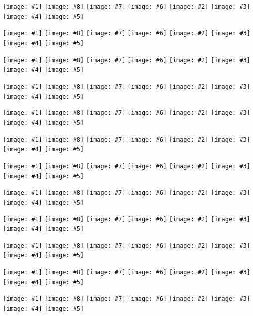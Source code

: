 \documentclass{article}
\newcommand{\zine}[8]{%
	\thispagestyle{empty}		
	\centering
	\texttt{[image: \#1]} %
	\hfill
	\texttt{[image: \#8]} %
	\hfill
	\texttt{[image: \#7]} %
	\hfill
	\texttt{[image: \#6]} %
	\texttt{[image: \#2]} %
	\hfill
	\texttt{[image: \#3]} %
	\hfill
	\texttt{[image: \#4]} %
	\hfill
	\texttt{[image: \#5]} %
}%
\begin{document}
	\zine{zine Cover 12 .pdf}{zine [1, 0, 1, 2] .pdf}{zine [2, 1, 0, 0] .pdf}{zine [0, 2, 2, 1] .pdf}{zine blank .pdf}{zine blank .pdf}{zine blank .pdf}{zine Back [3, 0, 2, 4] [[1, 0, 1, 2], [2, 1, 0, 0], [0, 2, 2, 1]] .pdf}
	\zine{zine Cover 13 .pdf}{zine [1, 1, 0, 1] .pdf}{zine [2, 0, 1, 2] .pdf}{zine [0, 2, 2, 0] .pdf}{zine blank .pdf}{zine blank .pdf}{zine blank .pdf}{zine Back [3, 2, 0, 3] [[1, 1, 0, 1], [2, 0, 1, 2], [0, 2, 2, 0]] .pdf}
	\zine{zine Cover 14 .pdf}{zine [0, 0, 0, 1] .pdf}{zine [1, 1, 2, 0] .pdf}{zine [2, 2, 1, 2] .pdf}{zine blank .pdf}{zine blank .pdf}{zine blank .pdf}{zine Back [0, 0, 1, 2] [[0, 0, 0, 1], [1, 1, 2, 0], [2, 2, 1, 2]] .pdf}
	\zine{zine Cover 15 .pdf}{zine [2, 2, 1, 2] .pdf}{zine [0, 0, 0, 0] .pdf}{zine [1, 1, 2, 1] .pdf}{zine blank .pdf}{zine blank .pdf}{zine blank .pdf}{zine Back [4, 4, 2, 4] [[2, 2, 1, 2], [0, 0, 0, 0], [1, 1, 2, 1]] .pdf}
	\zine{zine Cover 16 .pdf}{zine [1, 1, 1, 2] .pdf}{zine [0, 0, 2, 1] .pdf}{zine [2, 2, 0, 0] .pdf}{zine blank .pdf}{zine blank .pdf}{zine blank .pdf}{zine Back [2, 2, 3, 5] [[1, 1, 1, 2], [0, 0, 2, 1], [2, 2, 0, 0]] .pdf}
	\zine{zine Cover 17 .pdf}{zine [1, 0, 1, 2] .pdf}{zine [2, 2, 0, 1] .pdf}{zine [0, 1, 2, 0] .pdf}{zine blank .pdf}{zine blank .pdf}{zine blank .pdf}{zine Back [3, 1, 2, 5] [[1, 0, 1, 2], [2, 2, 0, 1], [0, 1, 2, 0]] .pdf}
	\zine{zine Cover 18 .pdf}{zine [0, 2, 1, 2] .pdf}{zine [2, 0, 2, 1] .pdf}{zine [1, 1, 0, 0] .pdf}{zine blank .pdf}{zine blank .pdf}{zine blank .pdf}{zine Back [1, 4, 3, 5] [[0, 2, 1, 2], [2, 0, 2, 1], [1, 1, 0, 0]] .pdf}
	\zine{zine Cover 19 .pdf}{zine [0, 0, 1, 0] .pdf}{zine [2, 1, 2, 2] .pdf}{zine [1, 2, 0, 1] .pdf}{zine blank .pdf}{zine blank .pdf}{zine blank .pdf}{zine Back [1, 0, 3, 1] [[0, 0, 1, 0], [2, 1, 2, 2], [1, 2, 0, 1]] .pdf}
	\zine{zine Cover 20 .pdf}{zine [1, 1, 1, 0] .pdf}{zine [0, 2, 2, 1] .pdf}{zine [2, 0, 0, 2] .pdf}{zine blank .pdf}{zine blank .pdf}{zine blank .pdf}{zine Back [2, 3, 3, 0] [[1, 1, 1, 0], [0, 2, 2, 1], [2, 0, 0, 2]] .pdf}
	\zine{zine Cover 21 .pdf}{zine [0, 2, 2, 1] .pdf}{zine [2, 1, 1, 2] .pdf}{zine [1, 0, 0, 0] .pdf}{zine blank .pdf}{zine blank .pdf}{zine blank .pdf}{zine Back [1, 5, 5, 3] [[0, 2, 2, 1], [2, 1, 1, 2], [1, 0, 0, 0]] .pdf}
	\zine{zine Cover 22 .pdf}{zine [0, 0, 1, 1] .pdf}{zine [1, 1, 2, 2] .pdf}{zine [2, 2, 0, 0] .pdf}{zine blank .pdf}{zine blank .pdf}{zine blank .pdf}{zine Back [0, 0, 3, 3] [[0, 0, 1, 1], [1, 1, 2, 2], [2, 2, 0, 0]] .pdf}
	\zine{zine Cover 23 .pdf}{zine [0, 2, 0, 0] .pdf}{zine [2, 0, 1, 1] .pdf}{zine [1, 1, 2, 2] .pdf}{zine blank .pdf}{zine blank .pdf}{zine blank .pdf}{zine Back [1, 4, 0, 0] [[0, 2, 0, 0], [2, 0, 1, 1], [1, 1, 2, 2]] .pdf}
\end{document}
